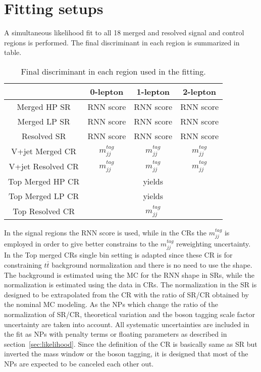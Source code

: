 \section{Fitting setups}
A simultaneous likelihood fit to all 18 merged and resolved signal and control regions is performed.
The final discriminant in each region is summarized in table.
\begin{table}[htbp]
 \footnotesize
\begin{center}
\begin{tabular}{ | c | c | c | c |} \hline
                      & 0-lepton        & 1-lepton       & 2-lepton  \\ \hline \hline
Merged HP SR          &  RNN score      &  RNN score     & RNN score     \\ \hline
Merged LP SR          &  RNN score      &  RNN score     & RNN score     \\ \hline
Resolved SR           &  RNN score      &  RNN score     & RNN score     \\ \hline \hline
V+jet Merged CR       & $m^{tag}_{jj}$  & $m^{tag}_{jj}$ & $m^{tag}_{jj}$\\ \hline 
V+jet Resolved CR     & $m^{tag}_{jj}$  & $m^{tag}_{jj}$ & $m^{tag}_{jj}$\\ \hline
Top Merged HP CR      &                 & yields         &               \\ \hline
Top Merged LP CR      &                 & yields         &               \\ \hline
Top Resolved CR       &                 & $m^{tag}_{jj}$ &               \\ \hline
\end{tabular}
\caption{\label{tab:discriminant} Final discriminant in each region used in the fitting. }
\end{center}
\end{table}
In the signal regions the RNN score is used, while in the CRs the $m^{tag}_{jj}$ is employed in order to give better constrains to the $m^{tag}_{jj}$ reweighting uncertainty. 
In the Top merged CRs single bin setting is adapted since these CR is for constraining $t\bar{t}$ background normalization and there is no need to use the shape. 
The background is estimated using the MC for the RNN shape in SRs, while the normalization is estimated using the data in CRs.
The normalization in the SR is designed to be extrapolated from the CR with the ratio of SR/CR obtained by the nominal MC modeling.
As the NPs which change the ratio of the normalization of SR/CR, theoretical variation and the boson tagging scale factor uncertainty are taken into account.
All systematic uncertainties are included in the fit as NPs with penalty terms or floating parameters as described in section~\ref{sec:likelihood}. Since the definition of the CR is basically same as SR but inverted the mass window or the boson tagging, it is designed that most of the NPs are expected to be canceled each other out.

